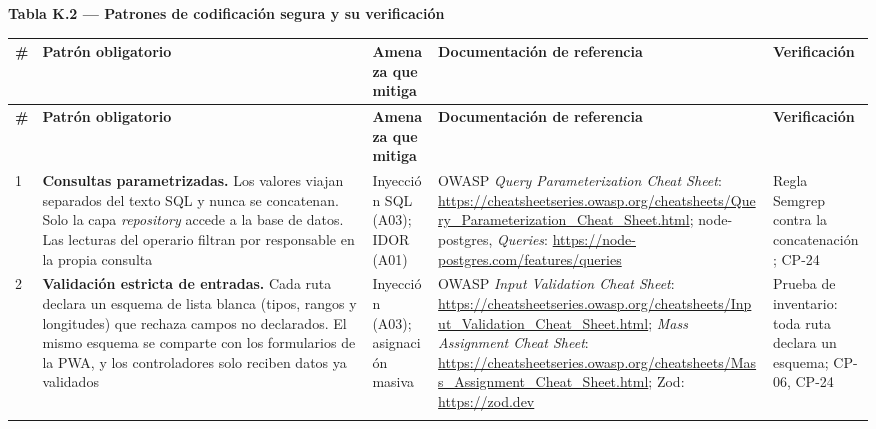 \documentclass[11pt,a4paper]{article}
\begin{document}
\textbf{Tabla K.2 --- Patrones de codificación segura y su verificación}\nopagebreak

\begingroup\small
\begin{longtable}{@{}>{\raggedright\arraybackslash\hspace{0pt}}p{}>{\raggedright\arraybackslash\hspace{0pt}}p{}>{\raggedright\arraybackslash\hspace{0pt}}p{}>{\raggedright\arraybackslash\hspace{0pt}}p{}>{\raggedright\arraybackslash\hspace{0pt}}p{}@{}}
\toprule
\textbf{\#} & \textbf{Patrón obligatorio} & \textbf{Amenaza que mitiga} & \textbf{Documentación de referencia} & \textbf{Verificación} \\ \midrule
\endfirsthead
\toprule
\textbf{\#} & \textbf{Patrón obligatorio} & \textbf{Amenaza que mitiga} & \textbf{Documentación de referencia} & \textbf{Verificación} \\ \midrule
\endhead
\bottomrule
\endlastfoot
\mbox{1} & \textbf{Consultas parametrizadas.} Los valores viajan separados del texto SQL y nunca se concatenan. Solo la capa \textit{repository} accede a la base de datos. Las lecturas del operario filtran por responsable en la propia consulta & Inyección SQL (A03); IDOR (A01) & OWASP \textit{Query Parameterization Cheat Sheet}: \url{https://cheatsheetseries.owasp.org/cheatsheets/Query_Parameterization_Cheat_Sheet.html}; node-postgres, \textit{Queries}: \url{https://node-postgres.com/features/queries} & Regla Semgrep contra la concatenación; \mbox{CP-24} \\ \addlinespace[0.25em]
\mbox{2} & \textbf{Validación estricta de entradas.} Cada ruta declara un esquema de lista blanca (tipos, rangos y longitudes) que rechaza campos no declarados. El mismo esquema se comparte con los formularios de la PWA, y los controladores solo reciben datos ya validados & Inyección (A03); asignación masiva & OWASP \textit{Input Validation Cheat Sheet}: \url{https://cheatsheetseries.owasp.org/cheatsheets/Input_Validation_Cheat_Sheet.html}; \textit{Mass Assignment Cheat Sheet}: \url{https://cheatsheetseries.owasp.org/cheatsheets/Mass_Assignment_Cheat_Sheet.html}; Zod: \url{https://zod.dev} & Prueba de inventario: toda ruta declara un esquema; \mbox{CP-06}, \mbox{CP-24} \\ \addlinespace[0.25em]

\end{longtable}
\end{document}
